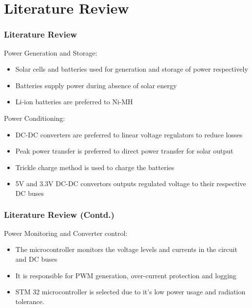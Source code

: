 \documentclass[aspectratio=169]{beamer}
\begin{document}
		\section{Literature Review}
		\begin{frame}
		\frametitle{Literature Review}

				
			Power Generation and Storage:
			\begin{itemize}
			\item  Solar cells and batteries used for generation and storage of power respectively
			\item Batteries supply power during absence of solar energy
			\item Li-ion batteries are preferred to Ni-MH
		\end{itemize}
	
	
		Power Conditioning:
	\begin{itemize}
		\item DC-DC converters are preferred to linear voltage regulators to reduce losses
		\item Peak power transfer is preferred to direct power transfer for solar output
		\item Trickle charge method is used to charge the batteries
		\item 5V and 3.3V DC-DC convertors outputs regulated voltage to their respective DC	 buses
	\end{itemize}
	\end{frame}
	\begin{frame}
		\frametitle{Literature Review (Contd.)}
Power Monitoring and Converter control:
	\begin{itemize}
	\item The microcontroller monitors the voltage levels and currents in the circuit and DC buses
	\item It is responsible for PWM generation, over-current protection and logging
	\item STM 32 microcontroller is selected due to it's low power usage and radiation tolerance.

\end{itemize}


	\end{frame}
	
	
\end{document}
